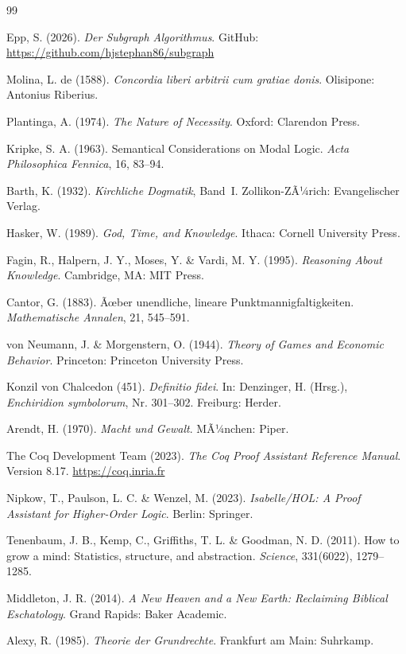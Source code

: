 ﻿\documentclass[a4paper,12pt]{article}
\theoremstyle{definition}
\begin{document}
\begin{thebibliography}{99}

Epp, S. (2026).
\textit{Der Subgraph Algorithmus}.
GitHub: \url{https://github.com/hjstephan86/subgraph}

Molina, L. de (1588).
\textit{Concordia liberi arbitrii cum gratiae donis}.
Olisipone: Antonius Riberius.

Plantinga, A. (1974).
\textit{The Nature of Necessity}.
Oxford: Clarendon Press.

Kripke, S. A. (1963).
Semantical Considerations on Modal Logic.
\textit{Acta Philosophica Fennica}, 16, 83--94.

Barth, K. (1932).
\textit{Kirchliche Dogmatik}, Band~I.
Zollikon-ZÃ¼rich: Evangelischer Verlag.

Hasker, W. (1989).
\textit{God, Time, and Knowledge}.
Ithaca: Cornell University Press.

Fagin, R., Halpern, J. Y., Moses, Y. \& Vardi, M. Y. (1995).
\textit{Reasoning About Knowledge}.
Cambridge, MA: MIT Press.

Cantor, G. (1883).
Ãœber unendliche, lineare Punktmannigfaltigkeiten.
\textit{Mathematische Annalen}, 21, 545--591.

von Neumann, J. \& Morgenstern, O. (1944).
\textit{Theory of Games and Economic Behavior}.
Princeton: Princeton University Press.

Konzil von Chalcedon (451).
\textit{Definitio fidei}.
In: Denzinger, H. (Hrsg.),
\textit{Enchiridion symbolorum}, Nr. 301--302. Freiburg: Herder.

Arendt, H. (1970).
\textit{Macht und Gewalt}.
MÃ¼nchen: Piper.

The Coq Development Team (2023).
\textit{The Coq Proof Assistant Reference Manual}.
Version 8.17. \url{https://coq.inria.fr}

Nipkow, T., Paulson, L. C. \& Wenzel, M. (2023).
\textit{Isabelle/HOL: A Proof Assistant for Higher-Order Logic}.
Berlin: Springer.

Tenenbaum, J. B., Kemp, C., Griffiths, T. L. \& Goodman, N. D. (2011).
How to grow a mind: Statistics, structure, and abstraction.
\textit{Science}, 331(6022), 1279--1285.

Middleton, J. R. (2014).
\textit{A New Heaven and a New Earth: Reclaiming Biblical Eschatology}.
Grand Rapids: Baker Academic.

Alexy, R. (1985).
\textit{Theorie der Grundrechte}.
Frankfurt am Main: Suhrkamp.

\end{thebibliography}
\end{document}
